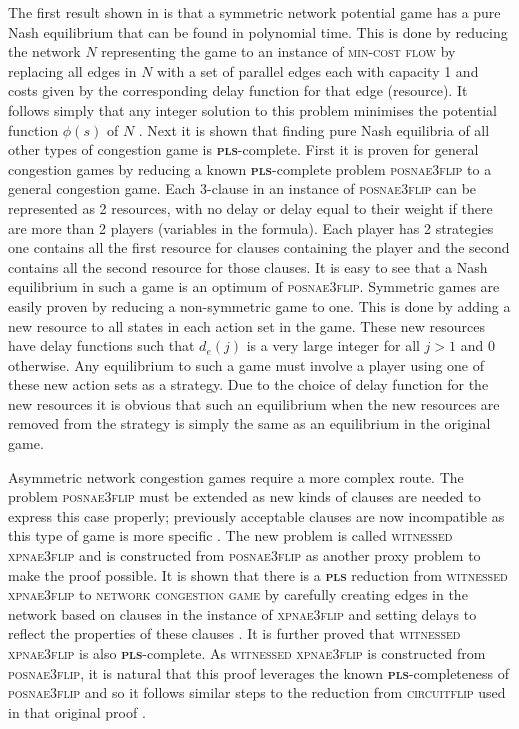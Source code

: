 \documentclass{article}
\begin{document}
\begin{multicols}{2}
\par
The first result shown in \cite{Fabrikant.2004} is that a symmetric network potential game has a pure Nash equilibrium that can be found in polynomial time. This is done by reducing the network $N$ representing the game to an instance of \textsc{min-cost flow} by replacing all edges in $N$ with a set of parallel edges each with capacity 1 and costs given by the corresponding delay function for that edge (resource). It follows simply that any integer solution to this problem minimises the potential function $\phi(s)$ of $N$ \cite{Fabrikant.2004}. Next it is shown that finding pure Nash equilibria of all other types of congestion game is \textbf{\textsc{pls}}-complete. First it is proven for general congestion games by reducing a known \textbf{\textsc{pls}}-complete problem \textsc{posnae3flip} \cite{local_search_complex} to a general congestion game. Each 3-clause in an instance of \textsc{posnae3flip} can be represented as 2 resources, with no delay or delay equal to their weight if there are more than 2 players (variables in the formula). Each player has 2 strategies one contains all the first resource for clauses containing the player and the second contains all the second resource for those clauses. It is easy to see that a Nash equilibrium in such a game is an optimum of \textsc{posnae3flip}. Symmetric games are easily proven by reducing a non-symmetric game to one. This is done by adding a new resource to all states in each action set in the game. These new resources have delay functions such that $d_e(j)$ is a very large integer for all $j>1$ and $0$ otherwise. Any equilibrium to such a game must involve a player using one of these new action sets as a strategy. Due to the choice of delay function for the new resources it is obvious that such an equilibrium when the new resources are removed from the strategy is simply the same as an equilibrium in the original game.

Asymmetric network congestion games require a more complex route. The problem \textsc{posnae3flip} must be extended as new kinds of clauses are needed to express this case properly; previously acceptable clauses are now incompatible as this type of game is more specific \cite{Fabrikant.2004}. The new problem is called \textsc{witnessed xpnae3flip} and is constructed from \textsc{posnae3flip} as another proxy problem to make the proof possible. It is shown that there is a \textbf{\textsc{pls}} reduction from \textsc{witnessed xpnae3flip} to \textsc{network congestion game} by carefully creating edges in the network based on clauses in the instance of \textsc{xpnae3flip} and setting delays to reflect the properties of these clauses \cite{Fabrikant.2004}. It is further proved that \textsc{witnessed xpnae3flip} is also \textbf{\textsc{pls}}-complete. As \textsc{witnessed xpnae3flip} is constructed from \textsc{posnae3flip}, it is natural that this proof leverages the known \textbf{\textsc{pls}}-completeness of \textsc{posnae3flip} and so it follows similar steps to the reduction from \textsc{circuitflip} used in that original proof \cite{local_search_complex}.


\end{multicols}
\end{document}
